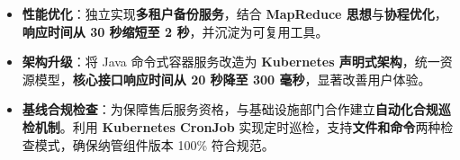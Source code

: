 \documentclass{resume}
\begin{document}
{\begin{itemize}[parsep=0.5ex]
\begin{itemize}[leftmargin=*, parsep=0pt, itemsep=0.5ex]
       \item \textbf{性能优化}：独立实现\textbf{多租户备份服务}，结合 \textbf{MapReduce 思想}与\textbf{协程优化}，\textbf{响应时间从 30 秒缩短至 2 秒}，并沉淀为可复用工具。
       \item \textbf{架构升级}：将 Java 命令式容器服务改造为 \textbf{Kubernetes 声明式架构}，统一资源模型，\textbf{核心接口响应时间从 20 秒降至 300 毫秒}，显著改善用户体验。
       \item \textbf{基线合规检查}：为保障售后服务资格，与基础设施部门合作建立\textbf{自动化合规巡检机制}。利用 \textbf{Kubernetes CronJob} 实现定时巡检，支持\textbf{文件和命令}两种检查模式，确保纳管组件版本 100\% 符合规范。
     \end{itemize}
 \end{itemize}
}
\CN{

}
\end{document}
